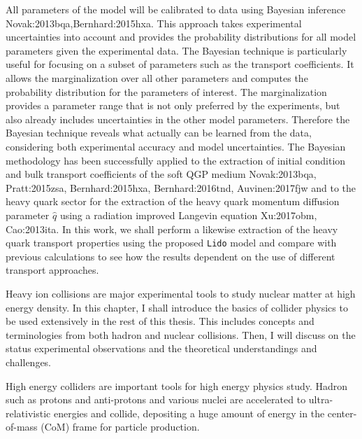 All parameters of the model will be calibrated to data using Bayesian inference {Novak:2013bqa,Bernhard:2015hxa}.
This approach takes experimental uncertainties into account and provides the probability distributions for all model parameters given the experimental data.
The Bayesian technique is particularly useful for focusing on a subset of parameters such as the transport coefficients.
It allows the marginalization over all other parameters and computes the probability distribution for the parameters of interest. 
The marginalization provides a parameter range that is not only preferred by the experiments, but also already includes uncertainties in the other model parameters.
Therefore the Bayesian technique reveals what actually can be learned from the data, considering both experimental accuracy and model uncertainties.
The Bayesian methodology has been successfully applied to the extraction of initial condition and bulk transport coefficients of the soft QGP medium {Novak:2013bqa, Pratt:2015zsa, Bernhard:2015hxa, Bernhard:2016tnd, Auvinen:2017fjw} and to the heavy quark sector for the extraction of the heavy quark momentum diffusion parameter $\hat{q}$ using a radiation improved Langevin equation {Xu:2017obm, Cao:2013ita}.
In this work, we shall perform a likewise extraction of the heavy quark transport properties using the proposed {\tt Lido} model and compare with previous calculations to see how the results dependent on the use of different transport approaches.


Heavy ion collisions are major experimental tools to study nuclear matter at high energy density.
In this chapter, I shall introduce the basics of collider physics to be used extensively in the rest of this thesis. 
This includes concepts and terminologies from both hadron and nuclear collisions. 
Then, I will discuss on the status experimental observations and the theoretical understandings and challenges.

High energy colliders are important tools for high energy physics study. 
Hadron such as protons and anti-protons and various nuclei are accelerated to ultra-relativistic energies and collide, depositing a huge amount of energy in the center-of-mass (CoM) frame for particle production.

